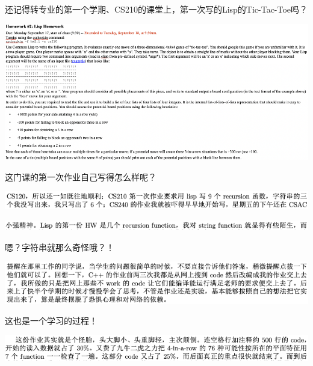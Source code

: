 \documentclass[9pt, b5paper]{article}
\begin{document}
还记得转专业的第一个学期、CS210的课堂上，第一次写的Lisp的Tic-Tac-Toe吗？

\begin{center}
\includegraphics[width=.9\linewidth]{./pic/backups_plans_20210501_213905.png}
\end{center}

这门课的第一次作业自己写得怎么样呢？

\begin{center}
\includegraphics[width=.9\linewidth]{./pic/backups_plans_20210501_214201.png}
\end{center}

\begin{center}
\includegraphics[width=.9\linewidth]{./pic/backups_plans_20210501_214052.png}
\end{center}

嗯？字符串就那么奇怪哦？！

\begin{center}
\includegraphics[width=.9\linewidth]{./pic/backups_plans_20210502_113933.png}
\end{center}

这也是一个学习的过程！

\begin{center}
\includegraphics[width=.9\linewidth]{./pic/backups_plans_20210502_114133.png}
\end{center}
\end{document}
